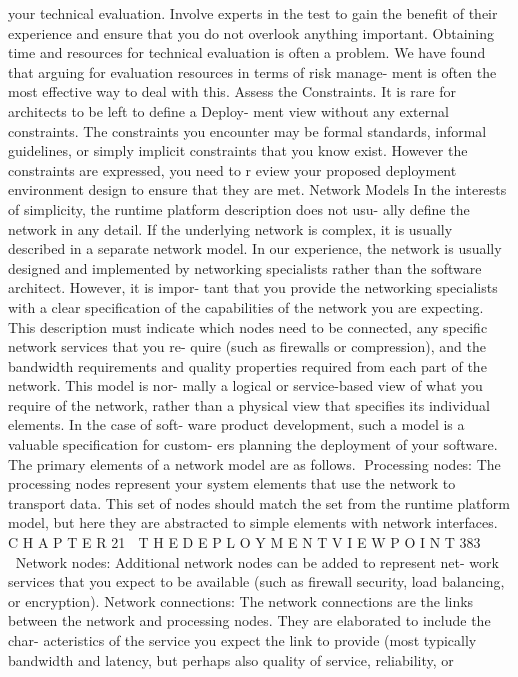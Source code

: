 your technical evaluation. Involve experts in the test to gain the benefit of their
experience and ensure that you do not overlook anything important.
Obtaining time and resources for technical evaluation is often a problem.
We have found that arguing for evaluation resources in terms of risk manage-
ment is often the most effective way to deal with this.
Assess the Constraints. It is rare for architects to be left to define a Deploy-
ment view without any external constraints. The constraints you encounter may
be formal standards, informal guidelines, or simply implicit constraints that you
know exist. However the constraints are expressed, you need to r eview your
proposed deployment environment design to ensure that they are met.
Network Models
In the interests of simplicity, the runtime platform description does not usu-
ally define the network in any detail. If the underlying network is complex, it
is usually described in a separate network model.
In our experience, the network is usually designed and implemented by
networking specialists rather than the software architect. However, it is impor-
tant that you provide the networking specialists with a clear specification of the
capabilities of the network you are expecting. This description must indicate
which nodes need to be connected, any specific network services that you re-
quire (such as firewalls or compression), and the bandwidth requirements and
quality properties required from each part of the network. This model is nor-
mally a logical or service-based view of what you require of the network, rather
than a physical view that specifies its individual elements. In the case of soft-
ware product development, such a model is a valuable specification for custom-
ers planning the deployment of your software.
The primary elements of a network model are as follows.
Processing nodes: The processing nodes represent your system elements
that use the network to transport data. This set of nodes should match
the set from the runtime platform model, but here they are abstracted to
simple elements with network interfaces.
C H A P T E R 21  T H E D E P L O Y M E N T V I E W P O I N T
 383
Network nodes: Additional network nodes can be added to represent net-
work services that you expect to be available (such as firewall security,
load balancing, or encryption).
Network connections: The network connections are the links between the
network and processing nodes. They are elaborated to include the char-
acteristics of the service you expect the link to provide (most typically
bandwidth and latency, but perhaps also quality of service, reliability, or
